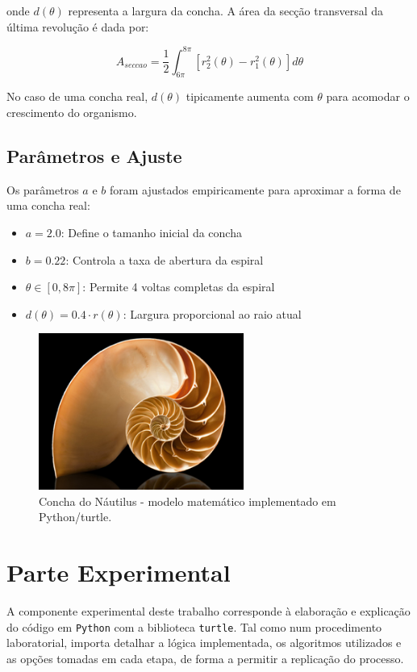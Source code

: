 \documentclass[12pt,a4paper,oneside]{extarticle}
\begin{document}
onde $d(\theta)$ representa a largura da concha. A área da secção transversal da última revolução é dada por:

\begin{equation}
A_{seccao} = \frac{1}{2}\int_{6\pi}^{8\pi} [r_2^2(\theta) - r_1^2(\theta)] d\theta
\label{eq:area_seccao}
\end{equation}

No caso de uma concha real, $d(\theta)$ tipicamente aumenta com $\theta$ para acomodar o crescimento do organismo.

\subsection{Parâmetros e Ajuste}
Os parâmetros $a$ e $b$ foram ajustados empiricamente para aproximar a forma de uma concha real:
\begin{itemize}
    \item $a = 2.0$: Define o tamanho inicial da concha
    \item $b = 0.22$: Controla a taxa de abertura da espiral
    \item $\theta \in [0, 8\pi]$: Permite 4 voltas completas da espiral
    \item $d(\theta) = 0.4 \cdot r(\theta)$: Largura proporcional ao raio atual
\end{itemize}

\begin{figure}[ht!]
    \centering
    \includegraphics[width=0.6\textwidth]{figuras/nautilus.png}
    \caption{Concha do Náutilus - modelo matemático implementado em Python/turtle.}
    \label{fig:referencia}
\end{figure}
  
\section{Parte Experimental}
A componente experimental deste trabalho corresponde à elaboração e explicação do código em \texttt{Python} com a biblioteca \texttt{turtle}. Tal como num procedimento laboratorial, importa detalhar a lógica implementada, os algoritmos utilizados e as opções tomadas em cada etapa, de forma a permitir a replicação do processo.
\end{document}
